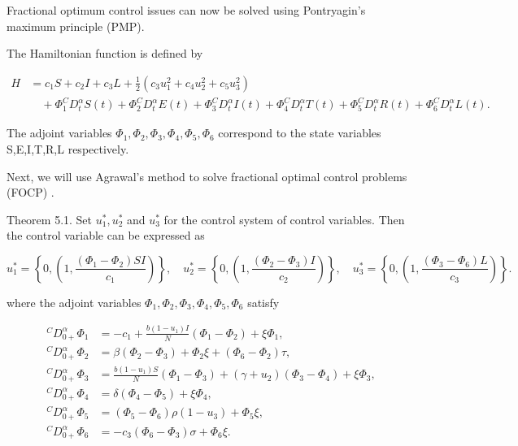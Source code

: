 \documentclass[10pt]{NSP1}
\begin{document}
Fractional optimum control issues can now be solved using Pontryagin’s maximum principle (PMP).

The Hamiltonian function is defined by

\[
\begin{matrix}
H & = c_{1}S + c_{2}I + c_{3}L + \frac{1}{2}\left( c_{3}u_{1}^{2} + c_{4}u_{2}^{2} + c_{5}u_{3}^{2} \right) \\ & \quad + \Phi_{1}^{C}D_{t}^{\alpha}S(t) + \Phi_{2}^{C}D_{t}^{\alpha}E(t) + \Phi_{3}^{C}D_{t}^{\alpha}I(t) + \Phi_{4}^{C}D_{t}^{\alpha}T(t) + \Phi_{5}^{C}D_{t}^{\alpha}R(t) + \Phi_{6}^{C}D_{t}^{\alpha}L(t).
\end{matrix}
\]

The adjoint variables \(\Phi_{1},\Phi_{2},\Phi_{3},\Phi_{4},\Phi_{5},\Phi_{6}\) correspond to the state variables S,E,I,T,R,L respectively.

Next, we will use Agrawal’s method to solve fractional optimal control problems (FOCP) .

Theorem 5.1. Set \(u_{1}^{*},u_{2}^{*}\) and \(u_{3}^{*}\) for the control system of control variables. Then the control variable can be expressed as

\[
u_{1}^{*} = \left\{ 0,\left( 1,\frac{\left( \Phi_{1} - \Phi_{2} \right)SI}{c_{1}} \right) \right\},\quad u_{2}^{*} = \left\{ 0,\left( 1,\frac{\left( \Phi_{2} - \Phi_{3} \right)I}{c_{2}} \right) \right\},\quad u_{3}^{*} = \left\{ 0,\left( 1,\frac{\left( \Phi_{3} - \Phi_{6} \right)L}{c_{3}} \right) \right\}.
\]

where the adjoint variables \(\Phi_{1},\Phi_{2},\Phi_{3},\Phi_{4},\Phi_{5},\Phi_{6}\) satisfy

\[
\begin{matrix}
^{C}D_{0 +}^{\alpha}\Phi_{1} & = - c_{1} + \frac{b\left( 1 - u_{1} \right)I}{N}\left( \Phi_{1} - \Phi_{2} \right) + \xi\Phi_{1}, \\
^{C}D_{0 +}^{\alpha}\Phi_{2} & = \beta\left( \Phi_{2} - \Phi_{3} \right) + \Phi_{2}\xi + \left( \Phi_{6} - \Phi_{2} \right)\tau, \\
^{C}D_{0 +}^{\alpha}\Phi_{3} & = \frac{b\left( 1 - u_{1} \right)S}{N}\left( \Phi_{1} - \Phi_{3} \right) + \left( \gamma + u_{2} \right)\left( \Phi_{3} - \Phi_{4} \right) + \xi\Phi_{3}, \\
^{C}D_{0 +}^{\alpha}\Phi_{4} & = \delta\left( \Phi_{4} - \Phi_{5} \right) + \xi\Phi_{4}, \\
^{C}D_{0 +}^{\alpha}\Phi_{5} & = \left( \Phi_{5} - \Phi_{6} \right)\rho\left( 1 - u_{3} \right) + \Phi_{5}\xi, \\
^{C}D_{0 +}^{\alpha}\Phi_{6} & = - c_{3}\left( \Phi_{6} - \Phi_{3} \right)\sigma + \Phi_{6}\xi.
\end{matrix}
\]
\end{document}
